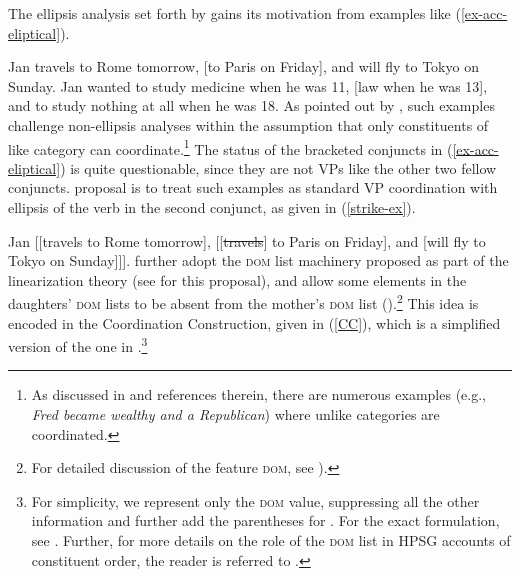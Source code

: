 The ellipsis analysis set forth by \citet{Beavers2004} gains its motivation 
from examples like  (\ref{ex-acc-eliptical}).%

\eal
\label{ex-acc-eliptical}
\ex Jan travels to Rome tomorrow, [to Paris on Friday], and will fly to Tokyo
on Sunday. \label{acc2}
\ex Jan wanted to study medicine when he was 11, [law when he was 13],
and to study nothing at all when he was 18. \label{acc3}\zl
%
As pointed out by \citet{Beavers2004}, such examples challenge non-ellipsis analyses within the assumption that only 
constituents of like category can coordinate.\footnote{As discussed in 
  and references therein, there are numerous examples (e.g., \textit{Fred became wealthy and a Republican}) where unlike categories are coordinated.}
The status of the bracketed conjuncts in (\ref{ex-acc-eliptical}) is quite questionable, since they are not VPs like the other two fellow conjuncts.  proposal is to treat such examples as standard VP coordination with ellipsis of the verb in the second conjunct, as
given in (\ref{strike-ex}). 

\ea
\label{strike-ex}
 Jan [[travels to Rome tomorrow], [[\sout{travels}] to Paris on Friday], and [will fly to Tokyo on Sunday]]].
\z 
%
\citet{Beavers2004} further adopt the \textsc{dom} list
machinery proposed as part of the linearization theory (see  \citealt{Crysmann2003a} for this proposal), and
allow some elements in the daughters' \textsc{dom} lists to be absent from 
the mother's \textsc{dom} list (\citealt{Yatabe2001,Crysmann2003a}).\footnote{For detailed discussion of the feature \textsc{dom}, see ).} 
%
%
This idea is encoded in the Coordination Construction, given in (\ref{CC}), which is a simplified
version of the one in \citep[27]{Beavers2004}.\footnote{For simplicity, we represent only the \textsc{dom} value, suppressing all the other information and further add the parentheses for . 
For the exact formulation, see \citet{Beavers2004}. Further, for 
more details on the role of the \textsc{dom} list in HPSG accounts of constituent order, the reader is referred to .}
%

